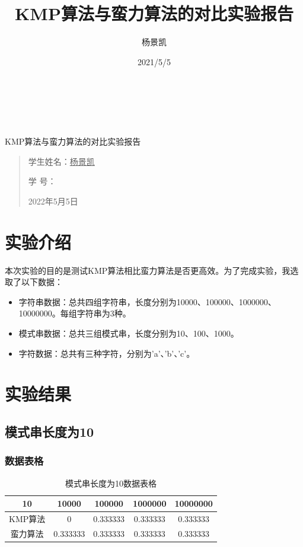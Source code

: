 \documentclass[UTF8]{ctexart}
\date{}
\title{KMP算法与蛮力算法的对比实验报告}
\author{杨景凯}
\date{2021/5/5}
\begin{document}
 
\begin{center}
    \quad \\
    \quad \\
    \quad \\
    \vskip 3.5cm
    \heiti {}KMP算法与蛮力算法的对比实验报告\\
\end{center}
\vskip 3.5cm
\begin{quotation}
    \songti \fontsize{30}{30}
    \doublespacing
    \par\setlength\parindent{12em}
    \quad 
\begin{center}

    学生姓名：\underline{\qquad    \quad \quad 杨景凯    \quad  \quad\qquad }

    学\hspace{0.61cm} 号：\underline{\quad \quad{}\quad\quad}

\end{center}
    
    \centering
    2022年5月5日
\end{quotation}
\clearpage
\tableofcontents
\clearpage
\section{实验介绍}
本次实验的目的是测试KMP算法相比蛮力算法是否更高效。为了完成实验，我选取了以下数据：
\begin{itemize}
    \item 字符串数据：总共四组字符串，长度分别为10000、100000、1000000、10000000。每组字符串为3种。
    \item 模式串数据：总共三组模式串，长度分别为10、100、1000。
    \item 字符数据：总共有三种字符，分别为'a'、'b'、'c'。
\end{itemize}
\clearpage
\section{实验结果}
\subsection{模式串长度为10}
\subsubsection{数据表格}
\begin{table}[h]
    \centering
    \begin{tabular}{|c|c|c|c|c|}
        \hline
        10&	10000&	100000&	1000000&	10000000\\
        \hline
        KMP算法&	0&	0.333333&	0.333333&	0.333333\\
        \hline
        蛮力算法&	0.333333&	0.333333&	0.333333&	0.333333\\
        \hline
    \end{tabular}
    \caption{模式串长度为10数据表格}
\end{table}
\end{document}
